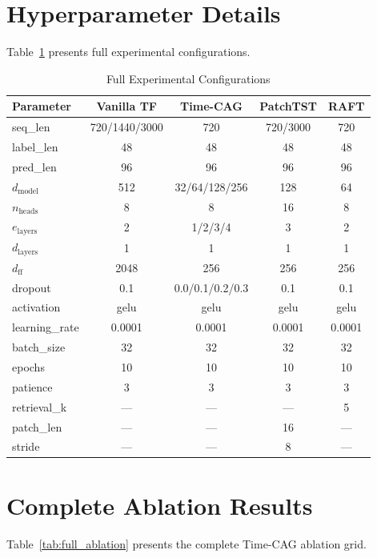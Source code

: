 \documentclass[10pt,twocolumn,letterpaper]{article}
\begin{document}
\section{Hyperparameter Details}

Table~\ref{tab:hyperparams} presents full experimental configurations.

\begin{table}[h]
\centering
\caption{Full Experimental Configurations}
\label{tab:hyperparams}
\small
\begin{tabular}{lcccc}
\toprule
\textbf{Parameter} & \textbf{Vanilla TF} & \textbf{Time-CAG} & \textbf{PatchTST} & \textbf{RAFT} \\
\midrule
seq\_len & 720/1440/3000 & 720 & 720/3000 & 720 \\
label\_len & 48 & 48 & 48 & 48 \\
pred\_len & 96 & 96 & 96 & 96 \\
$d_{\text{model}}$ & 512 & 32/64/128/256 & 128 & 64 \\
$n_{\text{heads}}$ & 8 & 8 & 16 & 8 \\
$e_{\text{layers}}$ & 2 & 1/2/3/4 & 3 & 2 \\
$d_{\text{layers}}$ & 1 & 1 & 1 & 1 \\
$d_{\text{ff}}$ & 2048 & 256 & 256 & 256 \\
dropout & 0.1 & 0.0/0.1/0.2/0.3 & 0.1 & 0.1 \\
activation & gelu & gelu & gelu & gelu \\
learning\_rate & 0.0001 & 0.0001 & 0.0001 & 0.0001 \\
batch\_size & 32 & 32 & 32 & 32 \\
epochs & 10 & 10 & 10 & 10 \\
patience & 3 & 3 & 3 & 3 \\
retrieval\_k & --- & --- & --- & 5 \\
patch\_len & --- & --- & 16 & --- \\
stride & --- & --- & 8 & --- \\
\bottomrule
\end{tabular}
\end{table}

\section{Complete Ablation Results}

Table~\ref{tab:full_ablation} presents the complete Time-CAG ablation grid.
\end{document}
